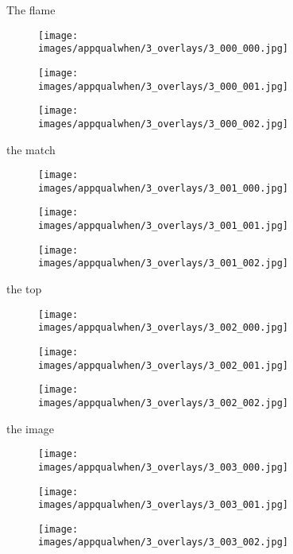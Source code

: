 \begin{figure}[t]
\centering
The flame
\begin{subfigure}{0.16\textwidth}
\texttt{[image: images/appqualwhen/3\_overlays/3\_000\_000.jpg]}
\end{subfigure}%
\begin{subfigure}{0.16\textwidth}
\texttt{[image: images/appqualwhen/3\_overlays/3\_000\_001.jpg]}
\end{subfigure}%
\begin{subfigure}{0.16\textwidth}
\texttt{[image: images/appqualwhen/3\_overlays/3\_000\_002.jpg]}
\end{subfigure}

the match
\begin{subfigure}{0.16\textwidth}
\texttt{[image: images/appqualwhen/3\_overlays/3\_001\_000.jpg]}
\end{subfigure}%
\begin{subfigure}{0.16\textwidth}
\texttt{[image: images/appqualwhen/3\_overlays/3\_001\_001.jpg]}
\end{subfigure}%
\begin{subfigure}{0.16\textwidth}
\texttt{[image: images/appqualwhen/3\_overlays/3\_001\_002.jpg]}
\end{subfigure}

the top
\begin{subfigure}{0.16\textwidth}
\texttt{[image: images/appqualwhen/3\_overlays/3\_002\_000.jpg]}
\end{subfigure}%
\begin{subfigure}{0.16\textwidth}
\texttt{[image: images/appqualwhen/3\_overlays/3\_002\_001.jpg]}
\end{subfigure}%
\begin{subfigure}{0.16\textwidth}
\texttt{[image: images/appqualwhen/3\_overlays/3\_002\_002.jpg]}
\end{subfigure}

the image
\begin{subfigure}{0.16\textwidth}
\texttt{[image: images/appqualwhen/3\_overlays/3\_003\_000.jpg]}
\end{subfigure}%
\begin{subfigure}{0.16\textwidth}
\texttt{[image: images/appqualwhen/3\_overlays/3\_003\_001.jpg]}
\end{subfigure}%
\begin{subfigure}{0.16\textwidth}
\texttt{[image: images/appqualwhen/3\_overlays/3\_003\_002.jpg]}
\end{subfigure}


\end{figure}
